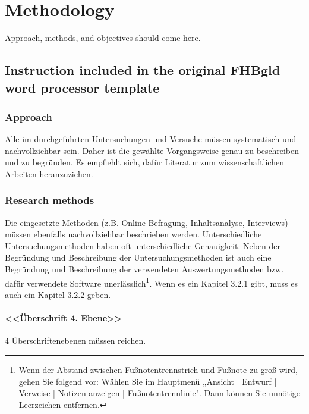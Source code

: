 \chapter{Methodology}

Approach, methods, and objectives should come here.

\section{Instruction included in the original FHBgld word processor template}
\subsection{Approach}
Alle im durchgeführten Untersuchungen und Versuche müssen systematisch und
nachvollziehbar sein. Daher ist die gewählte Vorgangsweise genau zu beschreiben
und zu begründen. Es empfiehlt sich, dafür Literatur zum wissenschaftlichen Arbeiten
heranzuziehen.
\subsection{Research methods}
Die eingesetzte Methoden (z.B. Online-Befragung, Inhaltsanalyse, Interviews) müssen
ebenfalls nachvollziehbar beschrieben werden.
Unterschiedliche Untersuchungsmethoden haben oft unterschiedliche Genauigkeit.
Neben der Begründung und Beschreibung der Untersuchungsmethoden ist auch eine
Begründung und Beschreibung der verwendeten Auswertungsmethoden bzw. dafür
verwendete Software unerlässlich\footnote{Wenn der Abstand zwischen Fußnotentrennstrich und Fußnote zu groß wird, gehen Sie folgend vor:
	Wählen Sie im Hauptmenü „Ansicht | Entwurf | Verweise | Notizen anzeigen |
	Fußnotentrennlinie". Dann können Sie unnötige Leerzeichen entfernen.
}.
Wenn es ein Kapitel 3.2.1 gibt, muss es auch ein Kapitel 3.2.2 geben.

\subsubsection{<<Überschrift 4. Ebene>>}
4 Überschriftenebenen müssen reichen.


